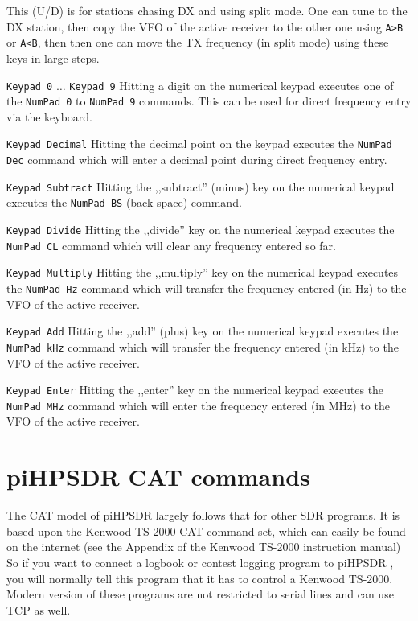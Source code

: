 \documentclass[12pt]{book}
\def\rett#1{\texttt{\color{red}#1}}
\def\bltt#1{\texttt{\color{blue}#1}}
\def\pH{pi\-HPSDR }
\begin{document}
This (U/D) is for stations chasing DX and using split mode. One can tune to the DX station,
then copy the VFO of the active receiver to the other one using \bltt{A>B} or \bltt{A<B}, then then
one can  move the TX frequency (in split mode) using these keys in large steps.

\rett{Keypad 0} $\ldots$ \rett{Keypad 9} Hitting a digit on the numerical keypad executes one of the
\bltt{NumPad 0} to \bltt{NumPad 9} commands. This can be used for direct frequency entry
via the keyboard.

\rett{Keypad Decimal} Hitting the decimal point on the keypad executes the \bltt{NumPad Dec}
command which will enter a decimal point during direct frequency entry.

\rett{Keypad Subtract} Hitting the ,,subtract'' (minus) key on the numerical keypad executes the
\bltt{NumPad BS} (back space) command.

\rett{Keypad Divide} Hitting the ,,divide'' key on the numerical keypad executes the \bltt{NumPad CL}
command which will clear any frequency entered so far.

\rett{Keypad Multiply} Hitting the ,,multiply'' key on the numerical keypad executes the \bltt{NumPad Hz}
command which will transfer the frequency entered (in Hz) to the VFO of the active receiver.

\rett{Keypad Add} Hitting the ,,add'' (plus) key on the numerical keypad executes the \bltt{NumPad kHz}
command which will transfer the frequency entered (in kHz) to the VFO of the active receiver.

\rett{Keypad Enter} Hitting the ,,enter'' key on the numerical keypad executes the \bltt{NumPad MHz}
command which will enter the frequency entered (in MHz) to the VFO of the active receiver.


\chapter{\pH CAT commands}
\label{sec:catcommands}
The CAT model of \pH largely follows that for other SDR programs. It is based upon the Kenwood TS-2000
CAT command
set, which can easily be found on the internet (see the Appendix of the Kenwood TS-2000 instruction manual)
So if you want to connect a logbook
or contest logging program to \pH, you will normally tell this program that it has to control a Kenwood
TS-2000. Modern version of these programs are not restricted to serial lines and can use TCP as well.
\end{document}
